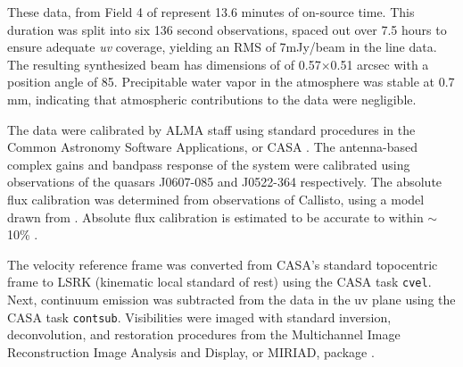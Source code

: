 



These data, from Field 4 of \citet{Mann2014} represent 13.6 minutes of on-source time. This duration was split into six 136 second observations, spaced out over 7.5 hours to ensure adequate \textit{uv} coverage, yielding an RMS of 7mJy/beam in the line data. The resulting synthesized beam has dimensions of of 0.57$\times$0.51 arcsec with a position angle of 85\degree. Precipitable water vapor in the atmosphere was stable at 0.7 mm, indicating that atmospheric contributions to the data were negligible.


The data were calibrated by ALMA staff using standard procedures in the Common Astronomy Software Applications, or CASA \citep{McMullin2007}. The antenna-based complex gains and bandpass response of the system were calibrated using observations of the quasars J0607-085 and J0522-364 respectively. The absolute flux calibration was determined from observations of Callisto, using a model drawn from \citet{Butler2012}. Absolute flux calibration is estimated to be accurate to within $\sim$10\% \citep{Mann2014}.



The velocity reference frame was converted from CASA's standard topocentric frame to LSRK (kinematic local standard of rest) using the CASA task \texttt{cvel}. Next, continuum emission was subtracted from the data in the uv plane using the CASA task \texttt{contsub}. Visibilities were imaged with standard inversion, deconvolution, and restoration procedures from the Multichannel Image Reconstruction Image Analysis and Display, or MIRIAD, package \citep{Sault1995}.
